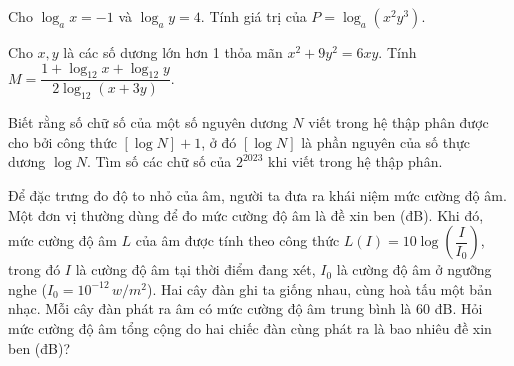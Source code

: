 \begin{ex}
	Cho $\log_a x =-1$ và $\log_a y =4$. Tính giá trị của $P=\log_a (x^2y^3)$.\\
\end{ex}

\begin{ex}%
	Cho $x,y$ là các số dương lớn hơn 1 thỏa mãn $x^2+9y^2=6xy$. Tính $M=\dfrac{1+\log_{12} x+ \log_{12} y}{2 \log_{12} (x+3y)}$.\\
\end{ex}

\begin{ex}%
	Biết rằng số chữ số của một số nguyên dương $N$ viết trong hệ thập phân được cho bởi công thức $[\log N]+1$, ở đó $[\log N]$ là phần nguyên của số thực dương $\log N$. Tìm số các chữ số của $2^{2023}$ khi viết trong hệ thập phân. \\
\end{ex}

\begin{ex}
	Để đặc trưng đo độ to nhỏ của âm, người ta đưa ra khái niệm mức cường độ âm. Một đơn vị thường dùng để đo mức cường độ âm là đề xin ben (đB). Khi đó, mức cường độ âm $L$ của âm được tính theo công thức $L(I)=10\log\left(\dfrac{I}{I_0} \right)$, trong đó $I$ là cường độ âm tại thời điểm đang xét, $I_0$ là cường độ âm ở ngưỡng nghe ($I_0=10^{-12}\, w/m^2$). Hai cây đàn ghi ta giống nhau, cùng hoà tấu một bản nhạc. Mỗi cây đàn phát ra âm có mức cường độ âm trung bình là 60 đB. Hỏi mức cường độ âm tổng cộng do hai chiếc đàn cùng phát ra là bao nhiêu đề xin ben (đB)?\\
	\loigiai{
	}
\end{ex}

